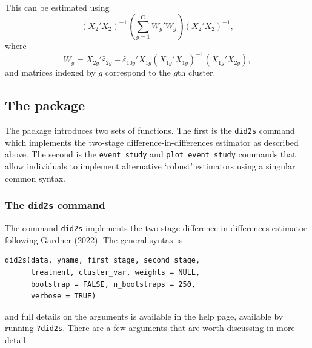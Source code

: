 This can be estimated using
\begin{equation}
  \left(X_2'X_2\right)^{-1} \left(\sum_{g=1}^G W_g' W_g\right) \left(X_2'X_2\right)^{-1},
\end{equation} where
\[
  W_g = X_{2g}'\hat{\varepsilon}_{2g} - \hat{\varepsilon}_{10g}' X_{1g}\left(X_{1g}'X_{1g}\right)^{-1} \left(X_{1g}'X_{2g}\right),
\]
and matrices indexed by \(g\) correspond to the \(g\)th cluster.

\hypertarget{the-package}{%
\subsection{\texorpdfstring{The  package}{The  package}}\label{the-package}}

The  package introduces two sets of functions. The first is the \texttt{did2s} command which implements the two-stage difference-in-differences estimator as described above. The second is the \texttt{event\_study} and \texttt{plot\_event\_study} commands that allow individuals to implement alternative `robust' estimators using a singular common syntax.

\hypertarget{the-did2s-command}{%
\subsubsection{\texorpdfstring{The \texttt{did2s} command}{The did2s command}}\label{the-did2s-command}}

The command \texttt{did2s} implements the two-stage difference-in-differences estimator following Gardner (2022). The general syntax is

\begin{verbatim}
did2s(data, yname, first_stage, second_stage, 
      treatment, cluster_var, weights = NULL, 
      bootstrap = FALSE, n_bootstraps = 250, 
      verbose = TRUE)
\end{verbatim}

and full details on the arguments is available in the help page, available by running \texttt{?did2s}. There are a few arguments that are worth discussing in more detail.

